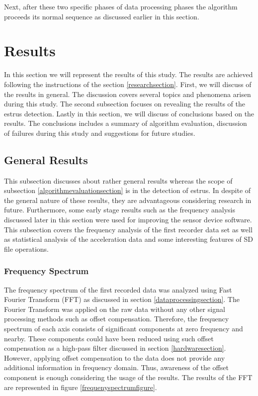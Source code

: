 \documentclass[english,12pt,a4paper,pdftex,elec,utf8]{aaltothesis}
\begin{document}
Next, after these two specific phases of data processing phases the algorithm proceeds its normal sequence as discussed earlier in this section.


\clearpage

\section{Results} \label{resultssection}
 
In this section we will represent the results of this study. The results are achieved following the instructions of the section \ref{researchsection}. First, we will discuss of the results in general. The discussion covers several topics and phenomena arisen during this study. The second subsection focuses on revealing the results of the estrus detection. Lastly in this section, we will discuss of conclusions based on the results. The conclusions includes a summary of algorithm evaluation, discussion of failures during this study and suggestions for future studies.



\subsection{General Results} \label{generalresultssection}

This subsection discusses about rather general results whereas the scope of subsection \ref{algorithmevaluationsection} is in the detection of estrus. In despite of the general nature of these results, they are advantageous considering research in future. Furthermore, some early stage results such as the frequency analysis discussed later in this section were used for improving the sensor device software. This subsection covers the frequency analysis of the first recorder data set as well as statistical analysis of the acceleration data and some interesting features of SD file operations.






\subsubsection{Frequency Spectrum}

The frequency spectrum of the first recorded data was analyzed using Fast Fourier Transform (FFT) as discussed in section \ref{dataprocessingsection}. The Fourier Transform was applied on the raw data without any other signal processing methods such as offset compensation. Therefore, the frequency spectrum of each axis consists of significant components at zero frequency and nearby. These components could have been reduced using such offset compensation as a high-pass filter discussed in section \ref{hardwaresection}. However, applying offset compensation to the data does not provide any additional information in frequency domain. Thus, awareness of the offset component is enough considering the usage of the results. The results of the FFT are represented in figure \ref{frequenyspectrumfigure}.
\end{document}
